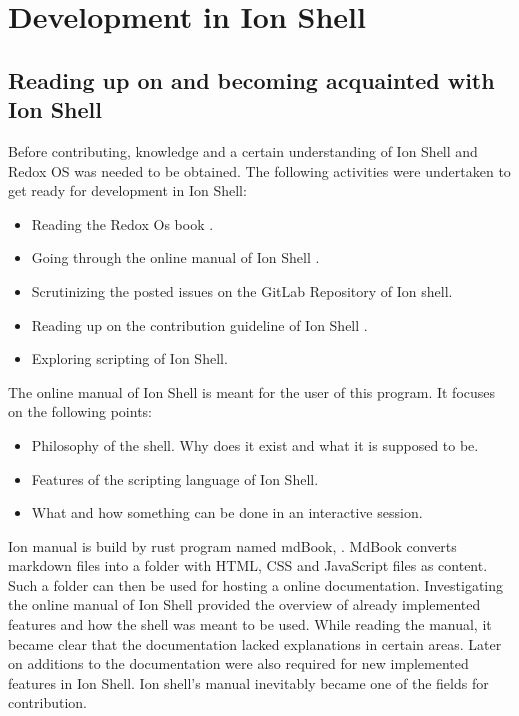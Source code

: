 \chapter{Development in Ion Shell}

\section{Reading up on and becoming acquainted with Ion Shell}

Before contributing, knowledge and a certain understanding of Ion Shell and Redox OS was needed to be obtained.
The following activities were undertaken to get ready for development in Ion Shell:

\begin{itemize}
	\item Reading the Redox Os book \cite{redox_os_book}.
	\item Going through the online manual of Ion Shell \cite{ion_manual_instroduction}.
	\item Scrutinizing the posted issues on the GitLab Repository of Ion shell.
	\item Reading up on the contribution guideline of Ion Shell \cite{ion_shell_contributing}.
	\item Exploring scripting of Ion Shell.
\end{itemize}

The online manual of Ion Shell is meant for the user of this program.
It focuses on the following points:

\begin{itemize}
	\item Philosophy of the shell. Why does it exist and what it is supposed to be.
	\item Features of the scripting language of Ion Shell.
	\item What and how something can be done in an interactive session.
\end{itemize}

Ion manual is build by rust program named mdBook, \cite{mdBook}.
MdBook converts markdown files into a folder with
HTML, CSS and JavaScript files as content.
Such a folder can then be used for hosting a online documentation.
Investigating the online manual of Ion Shell provided the overview of already implemented features and
how the shell was meant to be used.
While reading the manual, it became clear that the documentation lacked explanations in certain areas.
Later on additions to the documentation were also required for new implemented features in Ion Shell.
Ion shell's manual inevitably became one of the fields for contribution.


